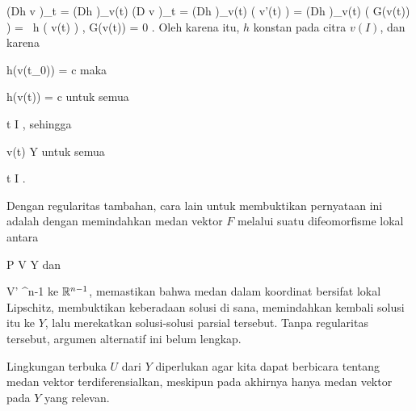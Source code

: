 {\mavergleichskettealign
{\vergleichskettealign
{ \left(Dh \circ v \right)_{t}
}
{ =} { \left(Dh  \right)_{v(t)} \circ  \left(D v \right)_{t}
}
{ =} { \left(Dh  \right)_{v(t)}  \left(  v'(t)  \right)
}
{ =} { \left(Dh  \right)_{v(t)}  \left(  G(v(t))  \right)
}
{ =} { \left\langle
{} \,  h  ( v(t) )  ,  G(v(t))    \right\rangle
}
}
{
\vergleichskettefortsetzungalign
{ =} { 0
}
{ } {}
{ } {}
{ } {}
}
{}{.}
Oleh karena itu, $h$ konstan pada citra $v( I)$, dan karena

\mavergleichskette
{\vergleichskette
{ h(v(t_0))
}
{ = }{ c
}
{  }{
}
{    }{
}
{   }{
}
}
{}{}{}
maka

\mavergleichskette
{\vergleichskette
{ h(v(t))
}
{ = }{ c
}
{  }{
}
{    }{
}
{   }{
}
}
{}{}{}
untuk semua

\mavergleichskette
{\vergleichskette
{ t
}
{ \in }{ I
}
{  }{
}
{    }{
}
{   }{
}
}
{}{}{,}
sehingga

\mavergleichskette
{\vergleichskette
{ v(t)
}
{ \in }{ Y
}
{  }{
}
{    }{
}
{   }{
}
}
{}{}{}
untuk semua

\mavergleichskette
{\vergleichskette
{ t
}
{ \in }{ I
}
{  }{
}
{    }{
}
{   }{
}
}
{}{}{.}

}

Dengan regularitas tambahan, cara lain untuk membuktikan pernyataan ini adalah dengan memindahkan medan vektor $F$ melalui suatu difeomorfisme lokal antara

\mavergleichskette
{\vergleichskette
{ P
}
{ \in }{ V
}
{ \subseteq }{ Y
}
{    }{
}
{   }{
}
}
{}{}{}
dan

\mavergleichskette
{\vergleichskette
{ V'
}
{ \subseteq }{ \R^{n-1}
}
{  }{
}
{    }{
}
{   }{
}
}
{}{}{}
ke ${\mathbb R}^{n-1}$, memastikan bahwa medan dalam koordinat bersifat lokal Lipschitz, membuktikan keberadaan solusi di sana, memindahkan kembali solusi itu ke $Y$, lalu merekatkan solusi-solusi parsial tersebut. Tanpa regularitas tersebut, argumen alternatif ini belum lengkap.

Lingkungan terbuka $U$ dari $Y$ diperlukan agar kita dapat berbicara tentang medan vektor terdiferensialkan, meskipun pada akhirnya hanya medan vektor pada $Y$ yang relevan.



